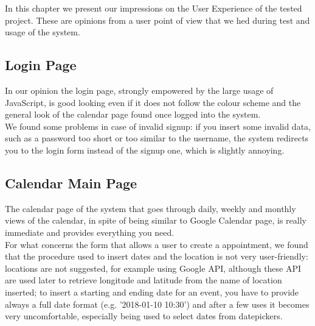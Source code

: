 In this chapter we present our impressions on the User Experience of the tested project. These are opinions from a user point of view that we hed during test and usage of the system.

\subsection{Login Page}
In our opinion the login page, strongly empowered by the large usage of JavaScript, is good looking even if it does not follow the colour scheme and the general look of the calendar page found once logged into the system. \\
We found some problems in case of invalid signup: if you insert some invalid data, such as a password too short or too similar to the username, the system redirects you to the login form instead of the signup one, which is slightly annoying.

\subsection{Calendar Main Page}
The calendar page of the system that goes through daily, weekly and monthly views of the calendar, in spite of being similar to Google Calendar page, is really immediate and provides everything you need. \\
For what concerns the form that allows a user to create a appointment, we found that the procedure used to insert dates and the location is not very user-friendly: locations are not suggested, for example using Google API, although these API are used later to retrieve longitude and latitude from the name of location inserted; to insert a starting and ending date for an event, you have to provide always a full date format (e.g. '2018-01-10 10:30') and after a few uses it becomes very uncomfortable, especially being used to select dates from datepickers.

